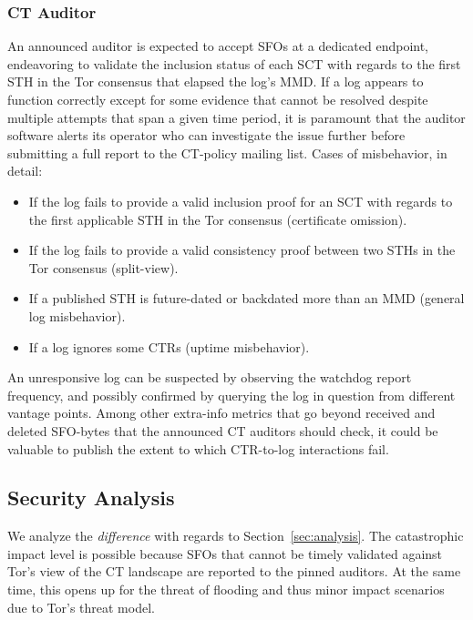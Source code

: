 \subsubsection{CT Auditor} \label{sec:auditor:auditor}
An announced auditor is expected to accept SFOs at a dedicated endpoint,
endeavoring to validate the inclusion status of each SCT with regards to the
first STH in the Tor consensus that elapsed the log's MMD.  If a log appears to
function correctly except for some evidence that cannot be
resolved despite multiple attempts that span a given time period, it is
paramount that the auditor software alerts its operator who can investigate
the issue further before submitting a full report to the CT-policy mailing list.
Cases of misbehavior, in detail:
\begin{itemize}
	\item If the log fails to provide a valid inclusion proof for an SCT with
		regards to the first applicable STH in the Tor consensus
		(certificate omission).
	\item If the log fails to provide a valid consistency proof between two
		STHs in the Tor consensus
		(split-view).
	\item If a published STH is future-dated or backdated more than an MMD
		(general log misbehavior).
	\item If a log ignores some CTRs (uptime misbehavior).
\end{itemize}

An unresponsive log can be suspected by observing the watchdog report frequency,
and possibly confirmed by querying the log in question from different vantage
points.  Among other extra-info metrics that go beyond received and deleted
SFO-bytes that the announced CT auditors should check, it could be valuable to
publish the extent to which CTR-to-log interactions fail.


\subsection{Security Analysis} \label{sec:auditor:analysis}
We analyze the \emph{difference} with regards to Section~\ref{sec:analysis}.
The catastrophic impact level is possible because SFOs that cannot be timely
validated against Tor's view of the CT landscape are reported to the pinned
auditors.  At the same time, this opens up for the threat of flooding and thus
minor impact scenarios due to Tor's threat model.

